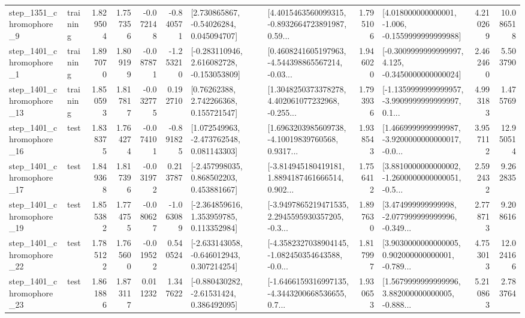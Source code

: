 \begin{tabular}{llrrrrllrlrr}
  step\_1351\_chromophore\_9 &  training &      1.829504 &    1.757356 &     -0.072148 & -0.840571 &     [2.730865867, -0.54026284, 0.045094707] &  [4.4015463560099315, -0.8932664723891987, 0.59... &       1.795106 &   [4.018000000000001, -1.006, -0.1559999999999988] &            4.210269 &         10.086518 \\
  step\_1401\_chromophore\_1 &  training &      1.897070 &    1.809199 &     -0.087871 & -1.253210 &   [-0.283110946, 2.616082728, -0.153053809] &  [0.4608241605197963, -4.544398865567214, -0.03... &       1.946020 &  [-0.3009999999999997, 4.125, -0.3450000000000024] &            2.462460 &          5.503790 \\
 step\_1401\_chromophore\_13 &  training &      1.850593 &    1.817817 &     -0.032775 &  0.192710 &      [0.76262388, 2.742266368, 0.155721547] &  [1.3048250373378278, 4.402061077232968, -0.255... &       1.793936 &  [-1.1359999999999957, -3.9909999999999997, 0.1... &            4.993183 &          1.475769 \\
 step\_1401\_chromophore\_16 &      test &      1.838375 &    1.764274 &     -0.074101 & -0.891825 &    [1.072549963, -2.473762548, 0.081143303] &  [1.6963203985609738, -4.10019839760568, 0.9317... &       1.938543 &  [1.4669999999999987, -3.9200000000000017, -0.0... &            3.957112 &         12.950514 \\
 step\_1401\_chromophore\_17 &      test &      1.849368 &    1.817396 &     -0.031972 &  0.213787 &    [-2.457998035, 0.868502203, 0.453881667] &  [-3.814945180419181, 1.8894187461666514, 0.902... &       1.756412 &  [3.8810000000000002, -1.2600000000000051, -0.5... &            2.592432 &          9.262835 \\
 step\_1401\_chromophore\_19 &      test &      1.855382 &    1.774755 &     -0.080627 & -1.063089 &    [-2.364859616, 1.353959785, 0.113352984] &  [-3.9497865219471535, 2.2945595930357205, -0.3... &       1.897630 &  [3.474999999999998, -2.077999999999996, -0.349... &            2.778713 &          9.208616 \\
 step\_1401\_chromophore\_22 &      test &      1.785122 &    1.765600 &     -0.019522 &  0.540524 &   [-2.633143058, -0.646012943, 0.307214254] &  [-4.3582327038904145, -1.082450354643588, -0.0... &       1.817997 &  [3.9030000000000005, 0.902000000000001, -0.789... &            4.753013 &         12.024166 \\
 step\_1401\_chromophore\_23 &      test &      1.861886 &    1.873117 &      0.011232 &  1.347622 &    [-0.880430282, -2.61531424, 0.386492095] &  [-1.6466159316997135, -4.3443200668536655, 0.7... &       1.930653 &  [1.5679999999999996, 3.882000000000005, -0.888... &            5.210863 &          2.783764 \\

\end{tabular}
